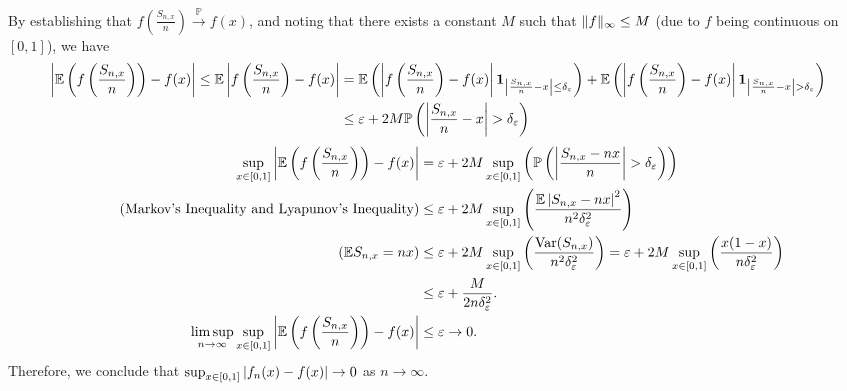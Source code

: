 \documentclass{huhtakm-template-book}
\newcommand{\prob}{\mathbb{P}}
\newcommand{\expect}{\mathbb{E}}
\DeclareMathOperator{\Var}{Var}
\begin{document}
    \begin{eg}
        By establishing that $f\left(\frac{S_{n,x}}{n}\right)\xrightarrow{\prob}f(x)$, and noting that there exists a constant $M$ such that $\lVert{f}\rVert_{\infty}\leq M$ (due to $f$ being continuous on $[0,1]$), we have
        \begin{align*}
            \abs{\expect\left(f\left(\frac{S_{n,x}}{n}\right)\right)-f(x)}\leq\expect\abs{f\left(\frac{S_{n,x}}{n}\right)-f(x)}&=\expect\left(\abs{f\left(\frac{S_{n,x}}{n}\right)-f(x)}\mathbf{1}_{\abs{\frac{S_{n,x}}{n}-x}\leq\delta_{\varepsilon}}\right)+\expect\left(\abs{f\left(\frac{S_{n,x}}{n}\right)-f(x)}\mathbf{1}_{\abs{\frac{S_{n,x}}{n}-x}>\delta_{\varepsilon}}\right)\\
            &\leq\varepsilon+2M\prob\left(\abs{\frac{S_{n,x}}{n}-x}>\delta_{\varepsilon}\right)
        \end{align*}
        \begin{align*}
            \sup_{x\in[0,1]}\abs{\expect\left(f\left(\frac{S_{n,x}}{n}\right)\right)-f(x)}&=\varepsilon+2M\sup_{x\in [0,1]}\left(\prob\left(\abs{\frac{S_{n,x}-nx}{n}}>\delta_{\varepsilon}\right)\right)\\
            \tag{Markov's Inequality and Lyapunov's Inequality}
            &\leq\varepsilon+2M\sup_{x\in[0,1]}\left(\frac{\expect\abs{S_{n,x}-nx}^{2}}{n^{2}\delta_{\varepsilon}^{2}}\right)\\
            \tag{$\expect S_{n,x}=nx$}
            &\leq\varepsilon+2M\sup_{x\in[0,1]}\left(\frac{\Var(S_{n,x})}{n^{2}\delta_{\varepsilon}^{2}}\right)=\varepsilon+2M\sup_{x\in[0,1]}\left(\frac{x(1-x)}{n\delta_{\varepsilon}^{2}}\right)\\
            &\leq\varepsilon+\frac{M}{2n\delta_{\varepsilon}^{2}}.\\
            \limsup_{n\to\infty}\sup_{x\in[0,1]}\abs{\expect\left(f\left(\frac{S_{n,x}}{n}\right)\right)-f(x)}&\leq\varepsilon\to 0.
        \end{align*}
        Therefore, we conclude that $\sup_{x\in[0,1]}\left|{f_{n}(x)-f(x)}\right|\to 0$ as $n\to\infty$.
    \end{eg}
\end{document}
